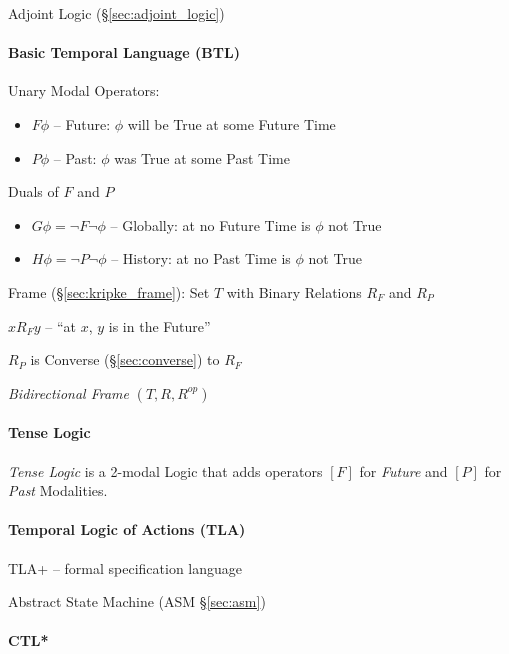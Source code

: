 Adjoint Logic (\S\ref{sec:adjoint_logic})



\paragraph{Basic Temporal Language (BTL)}\label{sec:btl}\hfill

Unary Modal Operators:
\begin{itemize}
  \item $F\phi$ -- Future: $\phi$ will be True at some Future Time
  \item $P\phi$ -- Past: $\phi$ was True at some Past Time
\end{itemize}

Duals of $F$ and $P$
\begin{itemize}
  \item $G\phi = \neg F \neg\phi$ -- Globally: at no Future Time is
    $\phi$ not True
  \item $H\phi = \neg P \neg\phi$ -- History: at no Past Time is
    $\phi$ not True
\end{itemize}

Frame (\S\ref{sec:kripke_frame}): Set $T$ with Binary Relations $R_F$
and $R_P$

$x R_F y$ -- ``at $x$, $y$ is in the Future''

$R_P$ is Converse (\S\ref{sec:converse}) to $R_F$

\emph{Bidirectional Frame} $(T,R,R^{op})$



\paragraph{Tense Logic}\label{sec:tense_logic}\hfill

\emph{Tense Logic} is a 2-modal Logic that adds operators $[F]$ for
\emph{Future} and $[P]$ for \emph{Past} Modalities.



\paragraph{Temporal Logic of Actions (TLA)}\label{sec:tla}\hfill

TLA+ -- formal specification language

Abstract State Machine (ASM \S\ref{sec:asm})



\paragraph{CTL*}\label{sec:ctl_star}\hfill

